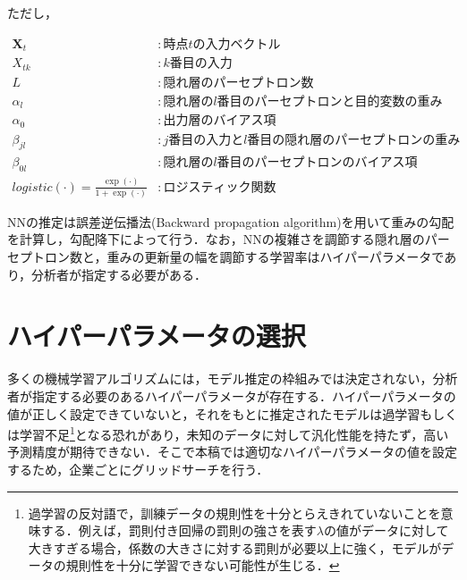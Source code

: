 \documentclass[a4paper，12pt]{jsarticle}
\begin{document}
ただし，

\begin{equation}
  \begin{split}
    \bm{X}_t &: 時点tの入力ベクトル \\
    X_{tk} &: k番目の入力 \\
    L &: 隠れ層のパーセプトロン数 \\
    \alpha_l &: 隠れ層のl番目のパーセプトロンと目的変数の重み \\
    \alpha_0 &: 出力層のバイアス項 \\
    \beta_{jl} &: j番目の入力とl番目の隠れ層のパーセプトロンの重み \\
    \beta_{0l} &: 隠れ層のl番目のパーセプトロンのバイアス項 \\
    \textit{logistic}(\cdot) = \frac{\exp(\cdot)}{1 + \exp(\cdot)} &: ロジスティック関数
  \end{split}
\end{equation}

NNの推定は誤差逆伝播法(Backward propagation algorithm)を用いて重みの勾配を計算し，勾配降下によって行う．なお，NNの複雑さを調節する隠れ層のパーセプトロン数と，重みの更新量の幅を調節する学習率はハイパーパラメータであり，分析者が指定する必要がある．

\section{ハイパーパラメータの選択} \label{sec:hyparam}

多くの機械学習アルゴリズムには，モデル推定の枠組みでは決定されない，分析者が指定する必要のあるハイパーパラメータが存在する．ハイパーパラメータの値が正しく設定できていないと，それをもとに推定されたモデルは過学習もしくは学習不足\footnote{過学習の反対語で，訓練データの規則性を十分とらえきれていないことを意味する．例えば，罰則付き回帰の罰則の強さを表す$\lambda$の値がデータに対して大きすぎる場合，係数の大きさに対する罰則が必要以上に強く，モデルがデータの規則性を十分に学習できない可能性が生じる．}となる恐れがあり，未知のデータに対して汎化性能を持たず，高い予測精度が期待できない．そこで本稿では適切なハイパーパラメータの値を設定するため，企業ごとにグリッドサーチを行う．
\end{document}
